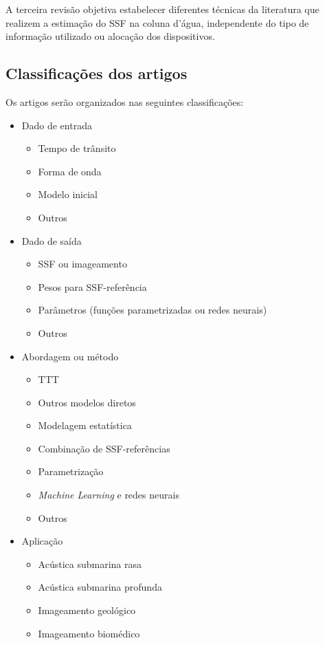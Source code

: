 A terceira revisão objetiva estabelecer diferentes técnicas da literatura que realizem a estimação do SSF na coluna d'água, independente do tipo de informação utilizado ou alocação dos dispositivos.

\subsection{Classificações dos artigos}

Os artigos serão organizados nas seguintes classificações:
\begin{itemize}[itemsep=0pt]
	\item Dado de entrada
	\begin{itemize}
		\item Tempo de trânsito
		\item Forma de onda
		\item Modelo inicial
		\item Outros
	\end{itemize}
	\item Dado de saída
	\begin{itemize}
		\item SSF ou imageamento
		\item Pesos para SSF-referência
		\item Parâmetros (funções parametrizadas ou redes neurais)
		\item Outros
	\end{itemize}
	\item Abordagem ou método
	\begin{itemize}
		\item TTT
		\item Outros modelos diretos
		\item Modelagem estatística
		\item Combinação de SSF-referências
		\item Parametrização
		\item \textsl{Machine Learning} e redes neurais
		\item Outros
	\end{itemize}
	\item Aplicação
	\begin{itemize}
		\item Acústica submarina rasa
		\item Acústica submarina profunda
		\item Imageamento geológico
		\item Imageamento biomédico
	\end{itemize}
\end{itemize}